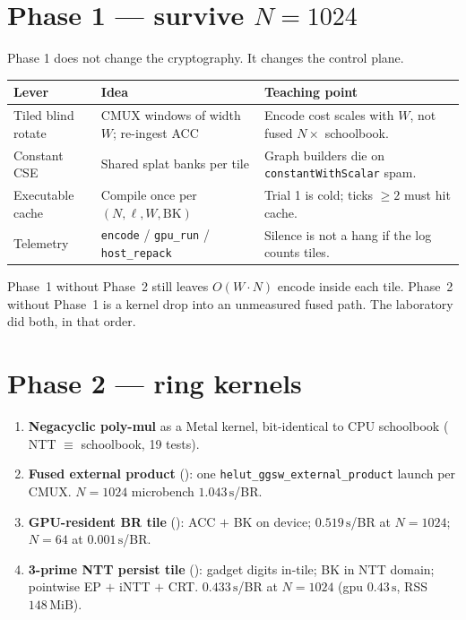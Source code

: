 \section{\texorpdfstring{Phase 1 --- survive $N=1024$}{Phase 1 --- survive N=1024}}

Phase 1 does not change the cryptography. It changes the control plane.

\begin{center}
\small
\begin{tabular}{@{}p{}p{}p{}@{}}
\toprule
Lever & Idea & Teaching point \\
\midrule
Tiled blind rotate & CMUX windows of width $W$; re-ingest ACC
  & Encode cost scales with $W$, not fused $N\times$ schoolbook. \\
Constant CSE & Shared splat banks per tile
  & Graph builders die on \texttt{constantWithScalar} spam. \\
Executable cache & Compile once per $(N,\ell,W,\mathrm{BK})$
  & Trial 1 is cold; ticks $\ge 2$ must hit cache. \\
Telemetry & \texttt{encode} / \texttt{gpu\_run} / \texttt{host\_repack}
  & Silence is not a hang if the log counts tiles. \\
\bottomrule
\end{tabular}
\end{center}

Phase~1 without Phase~2 still leaves $O(W\cdot N)$ encode inside each tile.
Phase~2 without Phase~1 is a kernel drop into an unmeasured fused path.
The laboratory did both, in that order.

\section{Phase 2 --- ring kernels}

\begin{enumerate}
  \item \textbf{Negacyclic poly-mul} as a Metal kernel, bit-identical to CPU
        schoolbook ( NTT $\equiv$ schoolbook, 19 tests).
  \item \textbf{Fused external product} (): one
        \texttt{helut\_ggsw\_external\_product} launch per CMUX.
        $N=1024$ microbench $1.043\,\mathrm{s}$/BR.
  \item \textbf{GPU-resident BR tile} (): ACC $+$ BK on device;
        $0.519\,\mathrm{s}$/BR at $N=1024$; $N=64$ at $0.001\,\mathrm{s}$/BR.
  \item \textbf{3-prime NTT persist tile} (): gadget digits in-tile;
        BK in NTT domain; pointwise EP $+$ iNTT $+$ CRT.
        $0.433\,\mathrm{s}$/BR at $N=1024$ (gpu $0.43\,\mathrm{s}$, RSS
        $148\,\mathrm{MiB}$).
\end{enumerate}

